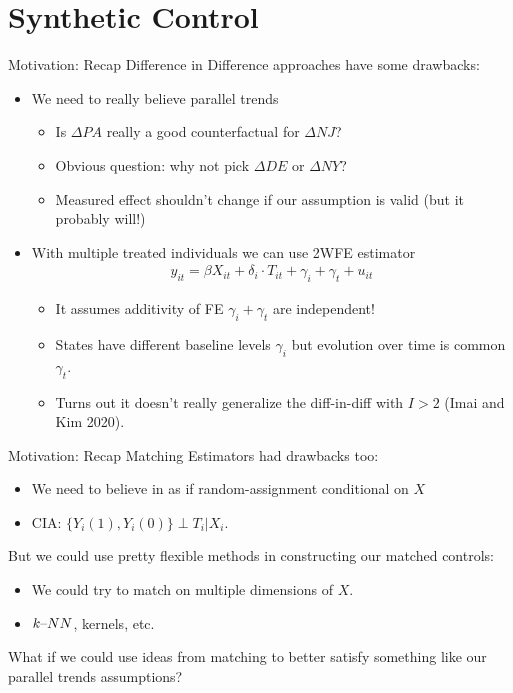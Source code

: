 \documentclass[aspectratio=169,11pt]{beamer}
\begin{document}
\section{Synthetic Control}



\begin{frame}{Motivation: Recap}
Difference in Difference approaches have some drawbacks:
\begin{itemize}
\item We need to really believe \alert{parallel trends}
\begin{itemize}
\item Is $\Delta PA$ really a good counterfactual for  $\Delta NJ$?
\item Obvious question: why not pick $\Delta DE$ or $\Delta NY$?
\item Measured effect shouldn't change if our assumption is valid (but it probably will!)
\end{itemize}
\item With multiple treated individuals we can use 2WFE estimator
\begin{align*}
y_{it} = \beta X_{it} + \delta_i \cdot T_{it} +  \gamma_i + \gamma_t + u_{it}
\end{align*}
\vspace{-0.8cm}
\begin{itemize}
\item It assumes \alert{additivity} of FE $\gamma_i + \gamma_t$ are independent!
\item States have different baseline levels $\gamma_i$ but evolution over time is common $\gamma_t$.
\item Turns out it doesn't really generalize the diff-in-diff with $I > 2$ (Imai and Kim 2020).
\end{itemize}            
\end{itemize}              
\end{frame}


\begin{frame}{Motivation: Recap}
Matching Estimators had drawbacks too:
\begin{itemize}
\item We need to believe in as if random-assignment conditional on $X$
\item CIA: $\{Y_i(1), Y_i(0)\} \perp T_i | X_i$.
\end{itemize}
But we could use pretty flexible methods in constructing our matched controls:           
\begin{itemize}
\item We could try to match on multiple dimensions of $X$.
\item $k\text{\textendash}NN$, kernels, etc.
\end{itemize}
What if we could use ideas from \alert{matching} to better satisfy something like our \alert{parallel trends} assumptions?
\end{frame}
\end{document}
